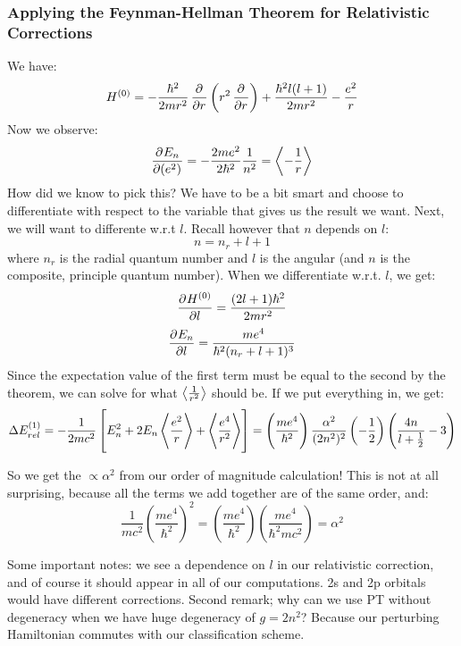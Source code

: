 \subsubsection{Applying the Feynman-Hellman Theorem for Relativistic Corrections}
We have:
\begin{equation}
    H^{(0)} = -\frac{\hbar^2}{2mr^2}\dpd{}{r}\left(r^2\dpd{}{r}\right) + \frac{\hbar^2l(l+1)}{2mr^2} - \frac{e^2}{r}
\end{equation}
Now we observe:
\begin{equation}
    \dpd{E_n}{(e^2)} = -\frac{2me^2}{2\hbar^2}\frac{1}{n^2} = \avg{-\frac{1}{r}}
\end{equation}
How did we know to pick this? We have to be a bit smart and choose to differentiate with respect to the variable that gives us the result we want. Next, we will want to differente w.r.t $l$. Recall however that $n$ depends on $l$:
\begin{equation}
    n = n_r + l + 1
\end{equation}
where $n_r$ is the radial quantum number and $l$ is the angular (and $n$ is the composite, principle quantum number). When we differentiate w.r.t. $l$, we get:
\begin{equation}
    \dpd{H^{(0)}}{l} = \frac{(2l+1)\hbar^2}{2mr^2}
\end{equation}
\begin{equation}
    \dpd{E_n}{l} = \frac{me^4}{\hbar^2(n_r + l + 1)^3}
\end{equation}
Since the expectation value of the first term must be equal to the second by the theorem, we can solve for what $\left< \frac{1}{r^2} \right>$ should be. If we put everything in, we get:
\begin{equation}
    \Delta E_{rel}^{(1)} = -\frac{1}{2mc^2}\left[E_n^2 + 2E_n\left< \frac{e^2}{r} \right> + \left< \frac{e^4}{r^2} \right>\right] = \left(\frac{me^4}{\hbar^2}\right)\frac{\alpha^2}{(2n^2)^2}\left(-\frac{1}{2}\right)\left(\frac{4n}{l+\frac{1}{2}} - 3\right)
\end{equation}

So we get the $\propto\alpha^2$ from our order of magnitude calculation! This is not at all surprising, because all the terms we add together are of the same order, and:
\begin{equation}
    \frac{1}{mc^2}\left(\frac{me^4}{\hbar^2}\right)^2 = \left(\frac{me^4}{\hbar^2}\right)\left(\frac{me^4}{\hbar^2mc^2}\right) = \alpha^2
\end{equation}

Some important notes: we see a dependence on $l$ in our relativistic correction, and of course it should appear in all of our computations. 2s and 2p orbitals would have different corrections. Second remark; why can we use PT without degeneracy when we have huge degeneracy of $g = 2n^2$? Because our perturbing Hamiltonian commutes with our classification scheme.

